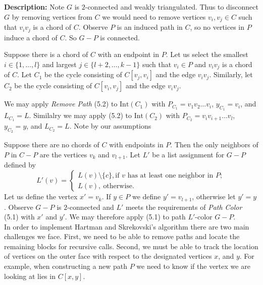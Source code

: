 \documentclass[letterpaper, 12pt]{amsart}
\theoremstyle{definition}
\theoremstyle{definition}
\theoremstyle{thm}
\theoremstyle{definition}
\begin{document}
\noindent\textbf{Description:}
Note $G$ is $2$-connected and weakly triangulated. Thus to disconnect $G$ by
removing vertices from $C$ we would need to remove vertices
$v_i,v_j\in C$ such that $v_iv_j$ is a chord of $C$.
Observe $P$ is an induced path in $C$, so no vertices in $P$ induce a chord of
$C$. So $G-P$ is connected.

Suppose there is a chord of $C$ with an endpoint in $P$. Let us select the
smallest $i\in\{1,\ldots,l\}$ and largest
$j\in\{l+2,\ldots,k-1\}$ such that $v_i\in P$ and $v_iv_j$ is a chord of $C$. Let $C_1$ be the
cycle consisting of $C[v_j,v_i]$ and the edge $v_iv_j$. Similarly, let $C_2$ be
the cycle consisting of $C[v_i,v_j]$ and the edge $v_iv_j$.

We may apply
\textit{Remove Path} (5.2) to $\text{Int}(C_1)$ with $P_{C_1}=v_1v_2\ldots v_i$, $y_{C_1}=v_i$,
and $L_{C_1}=L$. Similalry we may apply (5.2) to $\text{Int}(C_2)$ with
$P_{C_2}=v_iv_{i+1}\ldots v_l$, $y_{C_2}=y$, and $L_{C_2}=L$. Note by our assumptions 

Suppose there are no chords of $C$ with endpoints in $P$.
Then the only neighbors of $P$ in $C-P$ are the vertices $v_k$ and $v_{l+1}$.
Let $L'$ be a list assignment for $G-P$ defined by
\[
	L'(v) = \begin{cases}
				L(v)\setminus\{c\}, \text{if } v \text{ has at least one neighbor in } P;\\
				L(v), \ \text{otherwise}.
			\end{cases}
\]
Let us define the vertex $x'=v_k$. If $y\in P$ we define $y'=v_{l+1}$, otherwise let $y'=y$.
Observe $G-P$ is $2$-connected and $L'$ meets the requirements of \textit{Path Color} (5.1)
with $x'$ and $y'$. We may therefore apply (5.1) to path $L'$-color $G-P$.\\

In order to implement Hartman and Skrekovski's algorithm there are two main
challenges we face. First, we need to be able to remove paths and locate the
remaining blocks for recursive calls. Second, we must be able to track the
location of vertices on the outer face with respect to the designated vertices
$x$, and $y$. For example, when constructing a new path $P$ we need to know if
the vertex we are looking at lies in $C[x,y]$.
\end{document}

